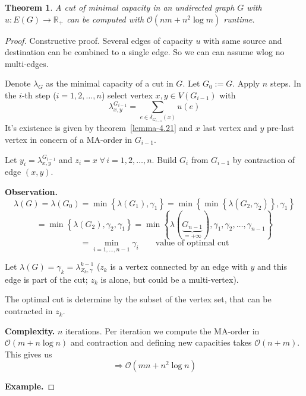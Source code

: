 \documentclass{article}
\newtheorem{theorem}{Theorem}
\newcommand{\set}[1]{\left\{#1\right\}}
\newcommand{\fall}{\;\forall\,}
\begin{document}
\begin{theorem}\label{satz-4.22}
  A cut of minimal capacity in an undirected graph $G$ with $u: E(G) \rightarrow \mathbb{R}_+$ can be computed with $\mathcal{O}(nm + n^2 \log{m})$ runtime.
\end{theorem}

\begin{proof}
  Constructive proof.
  Several edges of capacity $u$ with same source and destination can be combined to a single edge.
  So we can can assume wlog no multi-edges.

  Denote $\lambda_G$ as the minimal capacity of a cut in $G$. Let $G_0 := G$. Apply $n$ steps.
  In the $i$-th step ($i = 1, 2, \ldots, n$) select vertex $x, y \in V(G_{i-1})$ with
  \[
    \lambda^{G_{i-1}}_{x,y} = \sum_{e \in \delta_{G_{i-1}}(x)} u(e)
  \]
  It's existence is given by theorem~\ref{lemma-4.21} and $x$ last vertex and $y$ pre-last vertex in concern of a MA-order in $G_{i-1}$.

  Let $y_i = \lambda^{G_{i-1}}_{x,y}$ and $z_i = x \fall i = 1, 2, \ldots, n$.
  Build $G_i$ from $G_{i-1}$ by contraction of edge $(x, y)$.

  \textbf{Observation.}
    \[
      \lambda(G) = \lambda(G_0) = \min{\set{\lambda(G_1), \gamma_1}}
        = \min{\set{\min{\set{\lambda(G_2, \gamma_2)}, \gamma_1}}}
    \] \[
        = \min{\set{\lambda(G_2), \gamma_2, \gamma_1}}
        = \min{\set{\lambda(\underbrace{G_{n-1}}_{=+\infty}), \gamma_1, \gamma_2, \ldots, \gamma_{n-1}}}
    \] \[
        = \min_{i=1,\ldots,n-1} \gamma_i \qquad \text{value of optimal cut}
    \]
    
    Let $\lambda(G) = \gamma_k = \lambda_{Z_k, \gamma}^{k-1}$ ($z_k$ is a vertex connected by an edge with $y$ and this edge is part of the cut; $z_k$ is alone, but could be a multi-vertex).

    The optimal cut is determine by the subset of the vertex set, that can be contracted in $z_k$.

  \textbf{Complexity.}
    $n$ iterations. Per iteration we compute the MA-order in $\mathcal{O}(m + n \log{n})$ and contraction and defining new capacities takes $\mathcal{O}(n+m)$. This gives us
    \[ \Rightarrow \mathcal{O}(mn + n^2 \log{n}) \]

  \textbf{Example.}


\end{proof}
\end{document}
